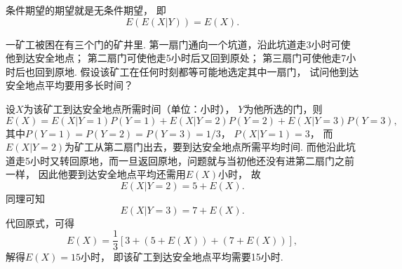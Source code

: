 \begin{theorem}\label{theorem:条件期望.条件期望与期望的关系}
条件期望的期望就是无条件期望，
即\begin{equation}
	E(E(X \vert Y)) = E(X).
\end{equation}
\end{theorem}

\begin{example}
一矿工被困在有三个门的矿井里.
第一扇门通向一个坑道，沿此坑道走3小时可使他到达安全地点；
第二扇门可使他走5小时后又回到原处；
第三扇门可使他走7小时后也回到原地.
假设该矿工在任何时刻都等可能地选定其中一扇门，
试问他到达安全地点平均要用多长时间？
\begin{solution}
设\(X\)为该矿工到达安全地点所需时间（单位：小时），
\(Y\)为他所选的门，则\begin{equation*}
	E(X)
	= E(X \vert Y=1) P(Y=1)
	+ E(X \vert Y=2) P(Y=2)
	+ E(X \vert Y=3) P(Y=3),
\end{equation*}
其中\(P(Y=1) = P(Y=2) = P(Y=3) = 1/3\)，
\(P(X \vert Y=1) = 3\)，
而\(E(X \vert Y=2)\)为矿工从第二扇门出去，要到达安全地点所需平均时间.
而他沿此坑道走5小时又转回原地，而一旦返回原地，问题就与当初他还没有进第二扇门之前一样，
因此他要到达安全地点平均还需用\(E(X)\)小时，
故\[
	E(X \vert Y=2)
	= 5 + E(X).
\]
同理可知\[
	E(X \vert Y=3)
	= 7 + E(X).
\]
代回原式，可得\[
	E(X) = \frac13[ 3 + (5 + E(X)) + (7 + E(X)) ],
\]
解得\(E(X) = 15\)小时，
即该矿工到达安全地点平均需要15小时.
\end{solution}
\end{example}
